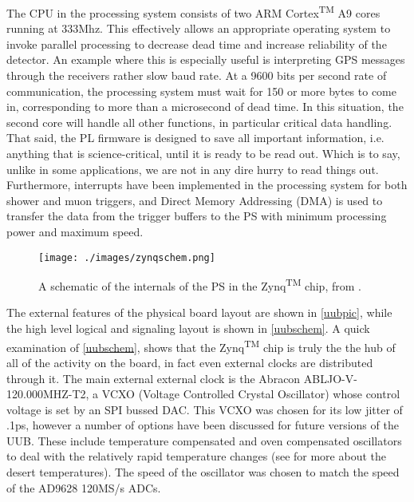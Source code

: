 The CPU in the processing system consists of two ARM Cortex\textsuperscript{TM} A9 cores running at 333Mhz. This effectively allows an appropriate operating system to invoke parallel processing to decrease dead time and increase reliability of the detector. An example where this is especially useful is interpreting GPS messages through the receivers rather slow baud rate. At a 9600 bits per second rate of communication, the processing system must wait for 150 or more bytes to come in, corresponding to more than a microsecond of dead time. In this situation, the second core will handle all other functions, in particular critical data handling. That said, the PL firmware is designed to save all important information, i.e. anything that is science-critical, until it is ready to be read out. Which is to say, unlike in some applications, we are not in any dire hurry to read things out. Furthermore, interrupts have been implemented in the processing system for both shower and muon triggers, and Direct Memory Addressing (DMA) is used to transfer the data from the trigger buffers to the PS with minimum processing power and maximum speed.

\begin{center}
\begin{figure}[H]
\texttt{[image: ./images/zynqschem.png]}
\caption[Zynq\textsuperscript{TM} Schematic]{A schematic of the internals of the PS in the Zynq\textsuperscript{TM} chip, from \textcite{zynq}.}
\label{zynqschem}
\end{figure}
\end{center}

The external features of the physical board layout are shown in \autoref{uubpic}, while the high level logical and signaling layout is shown in \autoref{uubschem}. A quick examination of \autoref{uubschem}, shows that the Zynq\textsuperscript{TM} chip is truly the the hub of all of the activity on the board, in fact even external clocks  are distributed through it. The main external external clock is the Abracon ABLJO-V-120.000MHZ-T2, a VCXO (Voltage Controlled Crystal Oscillator) whose control voltage is set by an SPI bussed DAC. This VCXO was chosen for its low jitter of .1ps, however a number of options have been discussed for future versions of the UUB. These include temperature compensated and oven compensated oscillators to deal with the relatively rapid temperature changes (see \textcite{brandt} for more about the desert temperatures). The speed of the oscillator was chosen to match the speed of the AD9628 120MS/s ADCs. 

